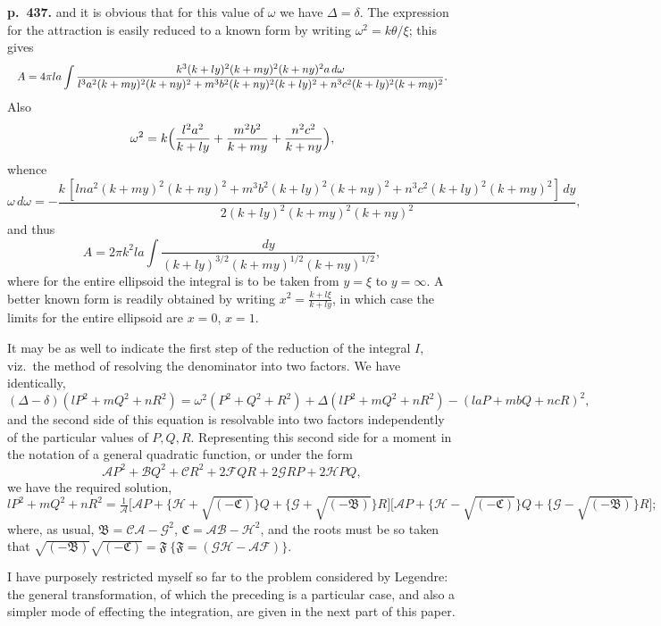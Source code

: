 \documentclass[11pt]{article}
\begin{document}
\noindent\textbf{p.~437.} and it is obvious that for this value of $\omega$ we have $\Delta = \delta$. The expression for the attraction is easily reduced to a known form by writing $\omega^2 = k\theta/\xi$; this gives
\[ \resizebox{\textwidth}{!}{$\displaystyle A = 4\pi la \int \frac{k^3(k + l y)^2(k + m y)^2(k + n y)^2 a\,d\omega}{l^3 a^2(k + m y)^2(k + n y)^2 + m^3 b^2(k + n y)^2(k + l y)^2 + n^3 c^2(k + l y)^2(k + m y)^2}.$} \]
Also
\[ \omega^2 = k\Bigl(\frac{l^2 a^2}{k + l y} + \frac{m^2 b^2}{k + m y} + \frac{n^2 c^2}{k + n y}\Bigr), \]
whence
\[ \omega\,d\omega = -\frac{k\,[lna^2(k + my)^2(k + ny)^2 + m^3 b^2(k + ly)^2(k + ny)^2 + n^3 c^2(k + ly)^2(k + my)^2]\,dy}{2(k + ly)^2(k + my)^2(k + ny)^2}, \]
and thus
\[ A = 2\pi k^2 la \int \frac{dy}{(k + l y)^{3/2}(k + m y)^{1/2}(k + n y)^{1/2}}, \]
where for the entire ellipsoid the integral is to be taken from $y = \xi$ to $y = \infty$. A better known form is readily obtained by writing $x^2 = \tfrac{k + l\xi}{k + l y}$, in which case the limits for the entire ellipsoid are $x = 0$, $x = 1$.

It may be as well to indicate the first step of the reduction of the integral $I$, viz.\ the method of resolving the denominator into two factors. We have identically,
\[ (\Delta - \delta)(lP^2 + mQ^2 + nR^2) = \omega^2(P^2 + Q^2 + R^2) + \Delta(lP^2 + mQ^2 + nR^2) - (laP + mbQ + ncR)^2, \]
and the second side of this equation is resolvable into two factors independently of the particular values of $P, Q, R$. Representing this second side for a moment in the notation of a general quadratic function, or under the form
\[ \mathcal{A}P^2 + \mathcal{B}Q^2 + \mathcal{C}R^2 + 2\mathcal{F}QR + 2\mathcal{G}RP + 2\mathcal{H}PQ, \]
we have the required solution,
\[ lP^2 + mQ^2 + nR^2 = \tfrac{1}{\mathcal{A}}\bigl[\mathcal{A}P + \{\mathcal{H} + \sqrt{(-\mathfrak{C})}\}Q + \{\mathcal{G} + \sqrt{(-\mathfrak{B})}\}R\bigr]\bigl[\mathcal{A}P + \{\mathcal{H} - \sqrt{(-\mathfrak{C})}\}Q + \{\mathcal{G} - \sqrt{(-\mathfrak{B})}\}R\bigr]; \]
where, as usual, $\mathfrak{B} = \mathcal{CA} - \mathcal{G}^2$, $\mathfrak{C} = \mathcal{AB} - \mathcal{H}^2$, and the roots must be so taken that $\sqrt{(-\mathfrak{B})}\sqrt{(-\mathfrak{C})} = \mathfrak{F}\ \{\mathfrak{F} = (\mathcal{GH} - \mathcal{AF})\}$.

I have purposely restricted myself so far to the problem considered by Legendre: the general transformation, of which the preceding is a particular case, and also a simpler mode of effecting the integration, are given in the next part of this paper.
\end{document}
